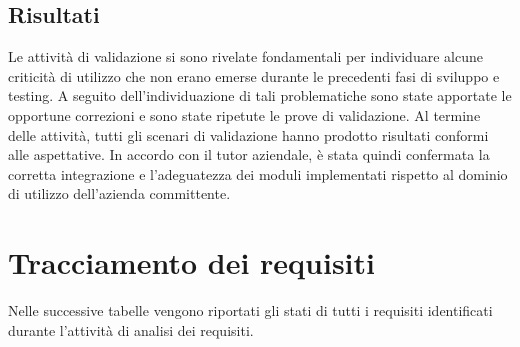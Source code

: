 \subsection{Risultati}
Le attività di validazione si sono rivelate fondamentali per individuare alcune criticità di utilizzo che non erano emerse durante le precedenti fasi di sviluppo e testing. 
A seguito dell'individuazione di tali problematiche sono state apportate le opportune correzioni e sono state ripetute le prove di validazione.
\newline
Al termine delle attività, tutti gli scenari di validazione hanno prodotto risultati conformi alle aspettative. In accordo con il tutor aziendale, è stata quindi confermata 
la corretta integrazione e l'adeguatezza dei moduli implementati rispetto al dominio di utilizzo dell'azienda committente.
\newpage

\section{Tracciamento dei requisiti}
Nelle successive tabelle vengono riportati gli stati di tutti i requisiti identificati durante l'attività di analisi dei requisiti.
